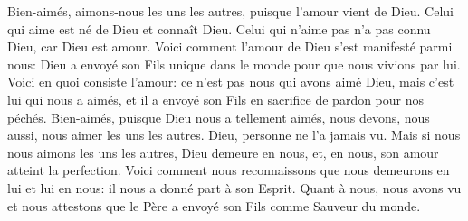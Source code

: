 Bien-aimés, aimons-nous les uns les autres,
	puisque l’amour vient de Dieu.
Celui qui aime est né de Dieu et connaît Dieu.
	Celui qui n’aime pas n’a pas connu Dieu, car Dieu est amour.
Voici comment l’amour de Dieu s’est manifesté parmi nous:
	Dieu a envoyé son Fils unique dans le monde pour que nous vivions par lui.
Voici en quoi consiste l’amour:
	ce n’est pas nous qui avons aimé Dieu, mais c’est lui qui nous a aimés,
	et il a envoyé son Fils en sacrifice de pardon pour nos péchés.
Bien-aimés, puisque Dieu nous a tellement aimés,
	nous devons, nous aussi, nous aimer les uns les autres.
Dieu, personne ne l’a jamais vu.
	Mais si nous nous aimons les uns les autres, Dieu demeure en nous,
	et, en nous, son amour atteint la perfection.
Voici comment nous reconnaissons que nous demeurons en lui et lui en nous:
	il nous a donné part à son Esprit.
Quant à nous, nous avons vu et nous attestons
	que le Père a envoyé son Fils comme Sauveur du monde.
